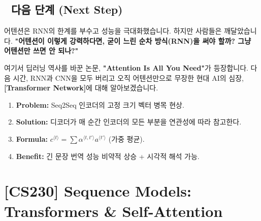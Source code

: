 \documentclass[11pt,a4paper]{book}
\theoremstyle{definition}
\begin{document}
\section*{🔗 다음 단계 (Next Step)}
어텐션은 RNN의 한계를 부수고 성능을 극대화했습니다. 하지만 사람들은 깨달았습니다.
\textbf{"어텐션이 이렇게 강력하다면, 굳이 느린 순차 방식(RNN)을 써야 할까? 그냥 어텐션만 쓰면 안 되나?"}

여기서 딥러닝 역사를 바꾼 논문, \textbf{"Attention Is All You Need"}가 등장합니다.
다음 시간, RNN과 CNN을 모두 버리고 오직 어텐션만으로 무장한 현대 AI의 심장, \textbf{[Transformer Network]}에 대해 알아보겠습니다.

\vspace{0.5cm}

\begin{summarybox}[title={단원 요약 (Cheat Sheet)}]
\begin{enumerate}
    \item \textbf{Problem:} Seq2Seq 인코더의 고정 크기 벡터 병목 현상.
    \item \textbf{Solution:} 디코더가 매 순간 인코더의 모든 부분을 연관성에 따라 참고한다.
    \item \textbf{Formula:} $c^{\langle t \rangle} = \sum \alpha^{\langle t, t' \rangle} a^{\langle t' \rangle}$ (가중 평균).
    \item \textbf{Benefit:} 긴 문장 번역 성능 비약적 상승 + 시각적 해석 가능.
\end{enumerate}
\end{summarybox}


\chapter{[CS230] Sequence Models: \\ Transformers \& Self-Attention}
\label{ch:lecture50}

\end{document}
